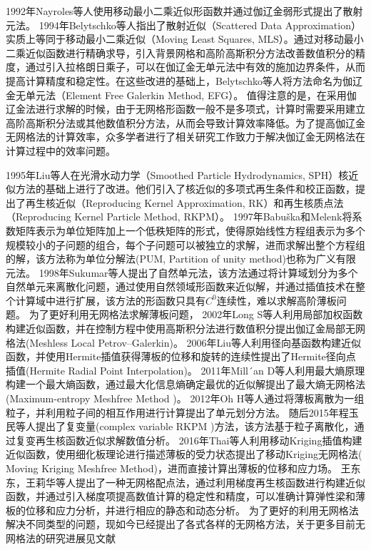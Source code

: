 1992年Nayroles等人\cite{nayroles1992}使用移动最小二乘近似形函数并通过伽辽金弱形式提出了散射元法。
1994年Belytschko等人\cite{belytschko1994}指出了散射近似（Scattered Data Approximation）实质上等同于移动最小二乘近似（Moving Least Squares, MLS）。通过对移动最小二乘近似函数进行精确求导，引入背景网格和高阶高斯积分方法改善数值积分的精度，通过引入拉格朗日乘子，可以在伽辽金无单元法中有效的施加边界条件，从而提高计算精度和稳定性。在这些改进的基础上，Belytschko等人将方法命名为伽辽金无单元法（Element Free Galerkin Method, EFG）。
值得注意的是，在采用伽辽金法进行求解的时候，由于无网格形函数一般不是多项式，计算时需要采用建立高阶高斯积分法或其他数值积分方法\cite{de2001,carpinteri2002,WangBingBing2019}，从而会导致计算效率降低\cite{melenk1996,WuJunChao2016}。为了提高伽辽金无网格法的计算效率，众多学者进行了相关研究工作致力于解决伽辽金无网格法在计算过程中的效率问题\cite{wang2016,wang2019,chen2001,chen2013,duan2012,duan2014}。

1995年Liu等人\cite{liu1995}在光滑水动力学（Smoothed Particle Hydrodynamics, SPH）核近似方法的基础上进行了改进。他们引入了核近似的多项式再生条件和校正函数，提出了再生核近似（Reproducing Kernel Approximation, RK）和再生核质点法（Reproducing Kernel Particle Method, RKPM）。
1997年Babuška和Melenk\cite{melenk1996,babuska1997}将系数矩阵表示为单位矩阵加上一个低秩矩阵的形式，使得原始线性方程组表示为多个规模较小的子问题的组合，每个子问题可以被独立的求解，进而求解出整个方程组的解，该方法称为单位分解法(PUM, Partition of unity method)也称为广义有限元法\cite{strouboulis2001}。
1998年Sukumar等人\cite{sukumar1998}提出了自然单元法，该方法通过将计算域划分为多个自然单元来离散化问题，通过使用自然领域形函数来近似解，并通过插值技术在整个计算域中进行扩展，该方法的形函数只具有$C^0$连续性，难以求解高阶薄板问题。
为了更好利用无网格法求解薄板问题，
2002年Long S等人\cite{long2002}利用局部加权函数构建近似函数，并在控制方程中使用高斯积分法进行数值积分提出伽辽金局部无网格法(Meshless Local Petrov–Galerkin)。
2006年Liu等人\cite{liu2006}利用径向基函数构建近似函数，并使用Hermite插值获得薄板的位移和旋转的连续性提出了Hermite径向点插值(Hermite Radial Point Interpolation)。
2011年Mill´an D等人\cite{millan2011}利用最大熵原理构建一个最大熵函数，通过最大化信息熵确定最优的近似解提出了最大熵无网格法(Maximum-entropy Meshfree  Method )。
2012年Oh H等人\cite{oh2012}通过将薄板离散为一组粒子，并利用粒子间的相互作用进行计算提出了单元划分方法。
随后2015年程玉民等人\cite{chen2015}提出了复变量(complex variable RKPM )方法，该方法基于粒子离散化，通过复变再生核函数近似求解数值分析。
2016年Thai等人\cite{thai2016}利用移动Kriging插值构建近似函数，使用细化板理论进行描述薄板的受力状态提出了移动Kriging无网格法( Moving Kriging Meshfree Method)，进而直接计算出薄板的位移和应力场。
王东东，王莉华等人\cite{wang2020,wang2021}提出了一种无网格配点法，通过利用梯度再生核函数进行构建近似函数，并通过引入梯度项提高数值计算的稳定性和精度，可以准确计算弹性梁和薄板的位移和应力分析，并进行相应的静态和动态分析。
为了更好的利用无网格法解决不同类型的问题，现如今已经提出了各式各样的无网格方法\cite{ChengYuMin2005,TanXianYun2011,LianYanPing2013,ZhangXiong2017,GaoXiaoWei2019}，关于更多目前无网格法的研究进展见文献\cite{nguyen2008,liu2009,张雄2009无网格法的理论及应用,wang2014,yreux2017,koester2019,rohit2020,王莉华2021配点型无网格法理论和研究进展,LiuYuXiang2021,朱志辉2021基于,sriram2021,ChenJian2022,LiYuDong2022}

